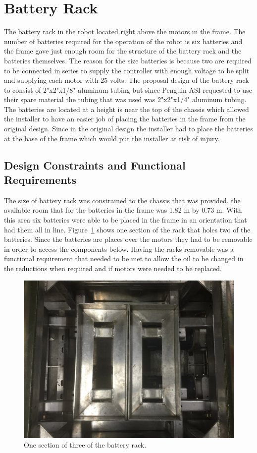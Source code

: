 \section{Battery Rack}
The battery rack in the robot located right above the motors in the frame. The number of batteries required for the operation of the robot is six batteries and the frame gave just enough room for the structure of the battery rack and the batteries themselves. The reason for the size batteries is because two are required to be connected in series to supply the controller with enough voltage to be split and supplying each motor with 25 volts. The proposal design of the battery rack to consist of 2"x2"x1/8" aluminum tubing but since Penguin ASI requested to use their spare material the tubing that was used was 2"x2"x1/4" aluminum tubing. The batteries are located at a height is near the top of the chassis which allowed the installer to have an easier job of placing the batteries in the frame from the original design. Since in the original design the installer had to place the batteries at the base of the frame which would put the installer at risk of injury. 
\subsection{Design Constraints and Functional Requirements}
The size of battery rack was constrained to the chassis that was provided. the available room that for the batteries in the frame was 1.82 m by 0.73 m. With this area six batteries were able to be placed in the frame in an orientation that had them all in line. Figure~\ref{fig:battery_rack_section} shows one section of the rack that holes two of the batteries. Since the batteries are places over the motors they had to be removable in order to access the components below. Having the racks removable was a functional requirement that needed to be met to allow the oil to be changed in the reductions when required and if motors were needed to be replaced.
\begin{figure}[H]
	\includegraphics[width=\linewidth]{images/battery_rack_mid_bld.jpg}
	\caption{One section of three of the battery rack.}
	\label{fig:battery_rack_section}
\end{figure}

